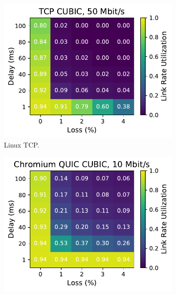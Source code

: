 \begin{figure}[ht]
\begin{subfigure}[b]{0.22\linewidth}
        \includegraphics[width=\linewidth,trim={0 0 2cm 0},clip]{splitting-paper/figures/heatmaps/heatmap_tcp_cubic_50mbps.pdf}
        \caption{Linux TCP.}
    \end{subfigure}
    \begin{subfigure}[b]{0.22\linewidth}
        \includegraphics[width=\linewidth,trim={0 0 2cm 0},clip]{splitting-paper/figures/heatmaps/heatmap_quic_cubic_10mbps.pdf}

\end{subfigure}
\end{figure}
